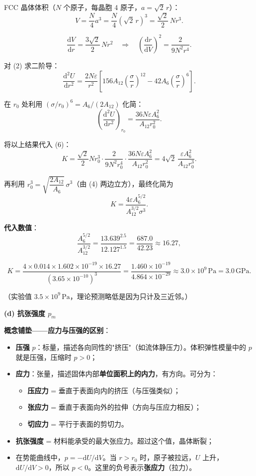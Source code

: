 FCC 晶体体积（$N$ 个原子，每晶胞 4 原子，$a = \sqrt{2}\,r$）：
\[
  V = \frac{N}{4}a^3 = \frac{N}{4}(\sqrt{2}\,r)^3 = \frac{\sqrt{2}}{2}\,Nr^3 .
\]

\[
  \frac{\mathrm{d}V}{\mathrm{d}r} = \frac{3\sqrt{2}}{2}\,Nr^2
  \quad\Longrightarrow\quad
  \left(\frac{\mathrm{d}r}{\mathrm{d}V}\right)^2 = \frac{2}{9N^2r^4} .
\]

对 (2) 求二阶导：
\[
  \frac{\mathrm{d}^2 U}{\mathrm{d}r^2}
  = \frac{2N\varepsilon}{r^2}\left[156A_{12}\left(\frac{\sigma}{r}\right)^{12} - 42A_6\left(\frac{\sigma}{r}\right)^{6}\right] .
\]

在 $r_0$ 处利用 $(\sigma/r_0)^6 = A_6/(2A_{12})$ 化简：
\[
  \left(\frac{\mathrm{d}^2 U}{\mathrm{d}r^2}\right)_{r_0}
  = \frac{36N\varepsilon A_6^2}{A_{12}r_0^2} .
\]

将以上结果代入 (6)：
\[
  K = \frac{\sqrt{2}}{2}Nr_0^3 \cdot \frac{2}{9N^2r_0^4} \cdot \frac{36N\varepsilon A_6^2}{A_{12}r_0^2}
    = 4\sqrt{2}\,\frac{\varepsilon A_6^2}{A_{12}r_0^3} .
\]

再利用 $r_0^3 = \sqrt{\dfrac{2A_{12}}{A_6}}\,\sigma^3$（由 (4) 两边立方），最终化简为
\[
  \boxed{K = \frac{4\varepsilon A_6^{5/2}}{A_{12}^{3/2}\sigma^3}} .
\tag{7}
\]

\textbf{代入数值}：
\[
  \frac{A_6^{5/2}}{A_{12}^{3/2}}
  = \frac{13.639^{2.5}}{12.127^{1.5}}
  = \frac{687.0}{42.23}
  \approx 16.27 ,
\]

\[
  K = \frac{4\times 0.014\times 1.602\times 10^{-19}\times 16.27}{(3.65\times 10^{-10})^3}
    = \frac{1.460\times 10^{-19}}{4.864\times 10^{-29}}
    \approx \boxed{3.0\times 10^9\,\text{Pa} = 3.0\,\text{GPa}} .
\]

（实验值 $3.5\times 10^9\,\text{Pa}$，理论预测略低是因为只计及三近邻。）

\textbf{(d) 抗张强度 $p_m$}

\textbf{概念铺垫——应力与压强的区别}：
\begin{itemize}[nosep]
  \item \textbf{压强} $p$：标量，描述各向同性的"挤压"（如流体静压力）。体积弹性模量中的 $p$ 就是压强，压缩时 $p>0$；
  \item \textbf{应力}：张量，描述固体内部\textbf{单位面积上的内力}，有方向。可分为：
  \begin{itemize}[nosep]
    \item \textbf{压应力} = 垂直于表面向内的挤压（与压强类似）；
    \item \textbf{张应力} = 垂直于表面向外的拉伸（方向与压应力相反）；
    \item \textbf{切应力} = 平行于表面的剪切力。
  \end{itemize}
  \item \textbf{抗张强度} = 材料能承受的最大张应力。超过这个值，晶体断裂；
  \item 在势能曲线中，$p = -\mathrm{d}U/\mathrm{d}V$。当 $r > r_0$ 时，原子被拉远，$U$ 上升，$\mathrm{d}U/\mathrm{d}V > 0$，所以 $p < 0$。这里的负号表示\textbf{张应力}（拉力）。
\end{itemize}

